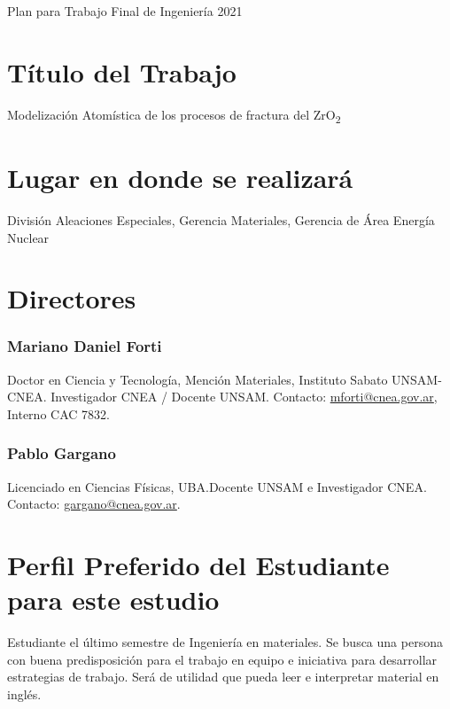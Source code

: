 \begin{center}

Plan para Trabajo Final de Ingeniería 2021

\end{center}

\section{ Título del Trabajo }

Modelización Atomística de los procesos de fractura del ZrO\textsubscript{2}

\section{ Lugar en donde se realizará }
División Aleaciones Especiales, Gerencia Materiales, Gerencia de Área Energía 
Nuclear

\section{Directores}

\subsubsection{Mariano Daniel Forti}

Doctor en Ciencia y Tecnología, Mención Materiales, Instituto Sabato 
UNSAM-CNEA. Investigador CNEA / Docente UNSAM. 
Contacto: \href{mailto:mforti@cnea.gov.ar}{mforti@cnea.gov.ar}, Interno CAC 7832.

\subsubsection{Pablo Gargano}

Licenciado en Ciencias Físicas, UBA.Docente UNSAM e Investigador CNEA.
Contacto: \href{mailto:gargano@cnea.gov.ar}{gargano@cnea.gov.ar}.

\section{Perfil Preferido del Estudiante para este estudio}

Estudiante el último semestre de Ingeniería en materiales.
Se busca una persona con buena predisposición para el trabajo
en equipo e iniciativa para desarrollar estrategias de 
trabajo. Será de utilidad que pueda leer e interpretar
material en inglés.  

